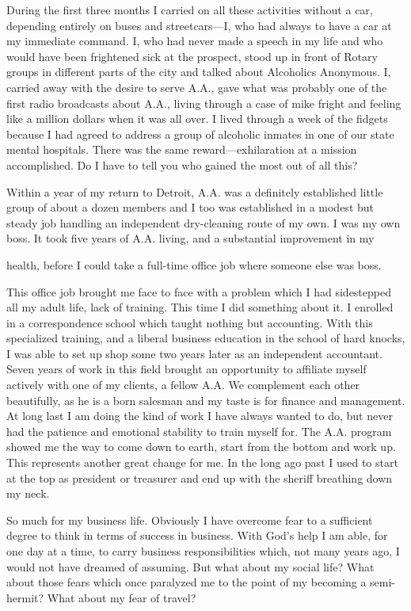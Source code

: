 \begin{biblechapter}
During the first three months I carried on all these activities without a car, depending entirely on buses and streetcars—I, who had always to have a car at my immediate command. I, who had never made a speech in my life and who would have been frightened sick at the prospect, stood up in front of Rotary groups in different parts of the city and talked about Alcoholics Anonymous. I, carried away with the desire to serve A.A., gave what was probably one of the first radio broadcasts about A.A., living through a case of mike fright and feeling like a million dollars when it was all over. I lived through a week of the fidgets because I had agreed to address a group of alcoholic inmates in one of our state mental hospitals. There was the same reward—exhilaration at a mission accomplished. Do I have to tell you who gained the most out of all this?

Within a year of my return to Detroit, A.A. was a definitely established little group of about a dozen members and I too was established in a modest but steady job handling an independent dry-cleaning route of my own. I was my own boss. It took five years of A.A. living, and a substantial improvement in my

health, before I could take a full-time office job where someone else was boss.

This office job brought me face to face with a problem which I had sidestepped all my adult life, lack of training. This time I did something about it. I enrolled in a correspondence school which taught nothing but accounting. With this specialized training, and a liberal business education in the school of hard knocks, I was able to set up shop some two years later as an independent accountant. Seven years of work in this field brought an opportunity to affiliate myself actively with one of my clients, a fellow A.A. We complement each other beautifully, as he is a born salesman and my taste is for finance and management. At long last I am doing the kind of work I have always wanted to do, but never had the patience and emotional stability to train myself for. The A.A. program showed me the way to come down to earth, start from the bottom and work up. This represents another great change for me. In the long ago past I used to start at the top as president or treasurer and end up with the sheriff breathing down my neck.

So much for my business life. Obviously I have overcome fear to a sufficient degree to think in terms of success in business. With God’s help I am able, for one day at a time, to carry business responsibilities which, not many years ago, I would not have dreamed of assuming. But what about my social life? What about those fears which once paralyzed me to the point of my becoming a semi-hermit? What about my fear of travel?


\end{biblechapter}
